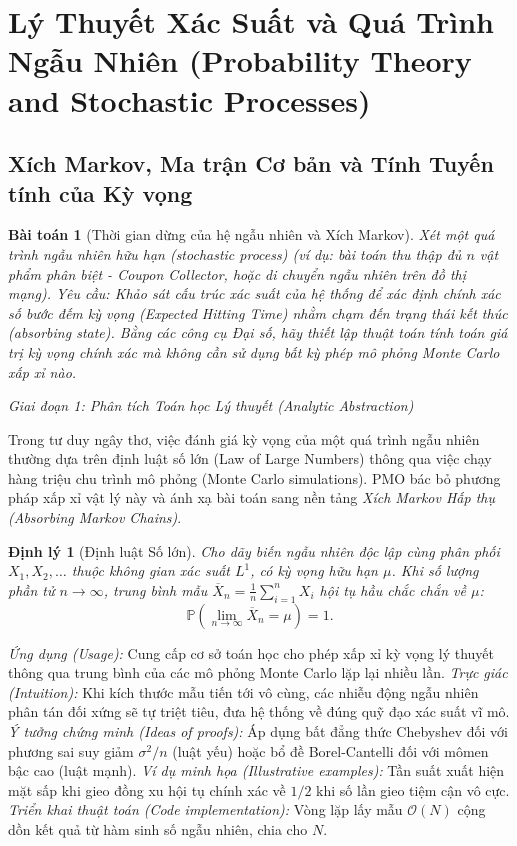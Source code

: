 \documentclass{article}
\newtheorem{baitoan}{Bài toán}
\newtheorem{dinhly}{Định lý}
\begin{document}

\section{Lý Thuyết Xác Suất và Quá Trình Ngẫu Nhiên (Probability Theory and Stochastic Processes)}
\subsection{Xích Markov, Ma trận Cơ bản và Tính Tuyến tính của Kỳ vọng}

\begin{baitoan}[Thời gian dừng của hệ ngẫu nhiên và Xích Markov]
Xét một quá trình ngẫu nhiên hữu hạn (stochastic process) (ví dụ: bài toán thu thập đủ $n$ vật phẩm phân biệt - Coupon Collector, hoặc di chuyển ngẫu nhiên trên đồ thị mạng). Yêu cầu: Khảo sát cấu trúc xác suất của hệ thống để xác định chính xác số bước đếm kỳ vọng (Expected Hitting Time) nhằm chạm đến trạng thái kết thúc (absorbing state). Bằng các công cụ Đại số, hãy thiết lập thuật toán tính toán giá trị kỳ vọng chính xác mà không cần sử dụng bất kỳ phép mô phỏng Monte Carlo xấp xỉ nào.
\end{baitoan}

\vspace{0.5em}\noindent\emph{Giai đoạn 1: Phân tích Toán học Lý thuyết (Analytic Abstraction)}

Trong tư duy ngây thơ, việc đánh giá kỳ vọng của một quá trình ngẫu nhiên thường dựa trên định luật số lớn (Law of Large Numbers) thông qua việc chạy hàng triệu chu trình mô phỏng (Monte Carlo simulations). PMO bác bỏ phương pháp xấp xỉ vật lý này và ánh xạ bài toán sang nền tảng \textit{Xích Markov Hấp thụ (Absorbing Markov Chains)}.

\begin{dinhly}[Định luật Số lớn]
Cho dãy biến ngẫu nhiên độc lập cùng phân phối $X_1, X_2, \dots$ thuộc không gian xác suất $L^1$, có kỳ vọng hữu hạn $\mu$. Khi số lượng phần tử $n \to \infty$, trung bình mẫu $\overline{X}_n = \frac{1}{n}\sum_{i=1}^n X_i$ hội tụ hầu chắc chắn về $\mu$:
$$ \mathbb{P}\left(\lim_{n \to \infty} \overline{X}_n = \mu\right) = 1. $$
\end{dinhly}
\emph{Ứng dụng (Usage):} Cung cấp cơ sở toán học cho phép xấp xỉ kỳ vọng lý thuyết thông qua trung bình của các mô phỏng Monte Carlo lặp lại nhiều lần.
\emph{Trực giác (Intuition):} Khi kích thước mẫu tiến tới vô cùng, các nhiễu động ngẫu nhiên phân tán đối xứng sẽ tự triệt tiêu, đưa hệ thống về đúng quỹ đạo xác suất vĩ mô.
\emph{Ý tưởng chứng minh (Ideas of proofs):} Áp dụng bất đẳng thức Chebyshev đối với phương sai suy giảm $\sigma^2/n$ (luật yếu) hoặc bổ đề Borel-Cantelli đối với mômen bậc cao (luật mạnh).
\emph{Ví dụ minh họa (Illustrative examples):} Tần suất xuất hiện mặt sấp khi gieo đồng xu hội tụ chính xác về $1/2$ khi số lần gieo tiệm cận vô cực.
\emph{Triển khai thuật toán (Code implementation):} Vòng lặp lấy mẫu $\mathcal{O}(N)$ cộng dồn kết quả từ hàm sinh số ngẫu nhiên, chia cho $N$.
\end{document}

